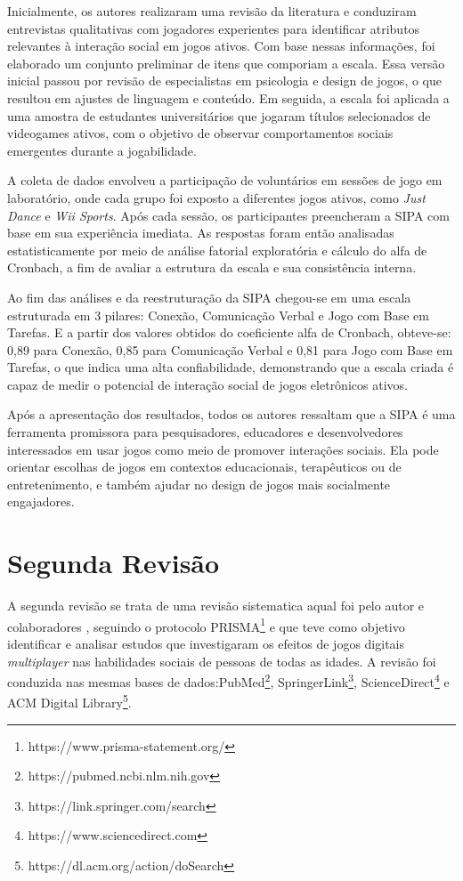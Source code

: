 Inicialmente, os autores realizaram uma revisão da literatura e conduziram entrevistas qualitativas com jogadores experientes para identificar atributos relevantes à interação social em jogos ativos. Com base nessas informações, foi elaborado um conjunto preliminar de itens que comporiam a escala. Essa versão inicial passou por revisão de especialistas em psicologia e design de jogos, o que resultou em ajustes de linguagem e conteúdo. Em seguida, a escala foi aplicada a uma amostra de estudantes universitários que jogaram títulos selecionados de videogames ativos, com o objetivo de observar comportamentos sociais emergentes durante a jogabilidade.

A coleta de dados envolveu a participação de voluntários em sessões de jogo em laboratório, onde cada grupo foi exposto a diferentes jogos ativos, como \textit{Just Dance} e \textit{Wii Sports}. Após cada sessão, os participantes preencheram a SIPA com base em sua experiência imediata. As respostas foram então analisadas estatisticamente por meio de análise fatorial exploratória e cálculo do alfa de Cronbach, a fim de avaliar a estrutura da escala e sua consistência interna.

Ao fim das análises e da reestruturação da SIPA chegou-se em uma escala estruturada em 3 pilares: Conexão, Comunicação Verbal e Jogo com Base em Tarefas.
E a partir dos valores obtidos do coeficiente alfa de Cronbach, obteve-se: 0,89 para Conexão, 0,85 para Comunicação Verbal e 0,81 para Jogo com Base em Tarefas, o que indica uma alta confiabilidade, demonstrando que a escala criada é capaz de medir o potencial de interação social de jogos eletrônicos ativos.

Após a apresentação dos resultados, todos os autores ressaltam que a SIPA é uma ferramenta promissora para pesquisadores, educadores e desenvolvedores interessados em usar jogos como meio de promover interações sociais. Ela pode orientar escolhas de jogos em contextos educacionais, terapêuticos ou de entretenimento, e também ajudar no design de jogos mais socialmente engajadores.



\section{Segunda Revisão}
A segunda revisão se trata de uma revisão sistematica aqual foi pelo autor e colaboradores \cite{Santos2026JogosMultiplayer}, seguindo o protocolo PRISMA\footnote{https://www.prisma-statement.org/} e que teve como objetivo identificar e analisar estudos que investigaram os efeitos de jogos digitais \textit{multiplayer} nas habilidades sociais de pessoas de todas as idades. A revisão foi conduzida nas mesmas bases de dados:PubMed\footnote{https://pubmed.ncbi.nlm.nih.gov}, SpringerLink\footnote{https://link.springer.com/search}, ScienceDirect\footnote{https://www.sciencedirect.com} e ACM Digital Library\footnote{https://dl.acm.org/action/doSearch}.


